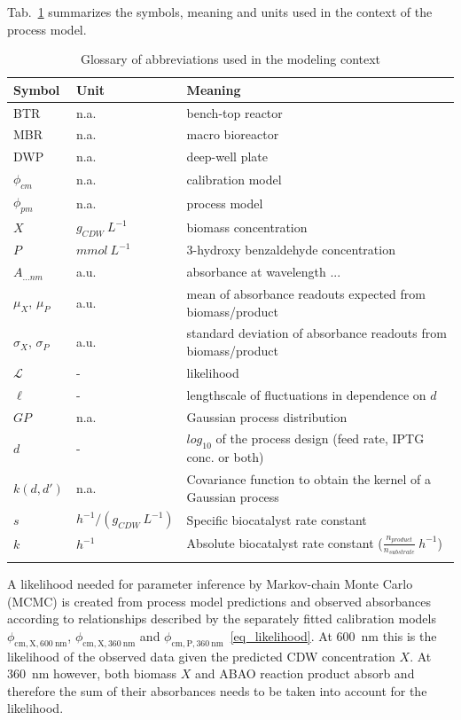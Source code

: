 \documentclass[sn-standardnature]{sn-jnl}%
\theoremstyle{thmstyleone}%
\theoremstyle{thmstyletwo}%
\theoremstyle{thmstylethree}%
\begin{document}
Tab.~\ref{tab_abbreviations} summarizes the symbols, meaning and units used in the context of the process model.


\begin{table}[h]
    \begin{center}
    \begin{minipage}{\textwidth}
    \caption{Glossary of abbreviations used in the modeling context}
    \label{tab_abbreviations}
    \begin{tabular}{@{}lll@{}}
\toprule
Symbol & Unit  & Meaning\\
\midrule
BTR & n.a. & bench-top reactor\\
MBR & n.a. & macro bioreactor\\
DWP & n.a. & deep-well plate\\
$\phi_{cm}$ & n.a. & calibration model\\
$\phi_{pm}$ & n.a. & process model\\
$X$ & $g_{CDW}\ L^{-1}$ & biomass concentration\\
$P$ & $mmol\ L^{-1}$ & 3-hydroxy benzaldehyde concentration\\
$A_{... nm}$ & a.u. & absorbance at wavelength ...\\
$\mu_X$, $\mu_P$ & a.u. & mean of absorbance readouts expected from biomass/product\\
$\sigma_X$, $\sigma_P$ & a.u. & standard deviation of absorbance readouts from biomass/product\\
$\mathcal{L}$ & - & likelihood\\
$\ell$ & - & lengthscale of fluctuations in dependence on $d$\\
$GP$ & n.a. & Gaussian process distribution\\
$d$ & - & $log_{10}$ of the process design (feed rate, IPTG conc. or both)\\
$k(d, d')$ & n.a. & Covariance function to obtain the kernel of a Gaussian process\\
$s$ & $h^{-1}/(g_{CDW}\ L^{-1})$ & Specific biocatalyst rate constant\\
$k$ & $h^{-1}$ & Absolute biocatalyst rate constant ($\frac{n_{product}}{n_{substrate}}\ h^{-1}$)\\
\botrule
    \end{tabular}
    \end{minipage}
    \end{center}
\end{table}

A likelihood needed for parameter inference by Markov-chain Monte Carlo (MCMC) is created from process model predictions and observed absorbances according to relationships described by the separately fitted calibration models $\phi_\mathrm{cm,X,600\ nm}$, $\phi_\mathrm{cm,X,360\ nm}$ and $\phi_\mathrm{cm,P,360\ nm}$~\eqref{eq_likelihood}.
At 600~nm this is the likelihood of the observed data given the predicted CDW concentration $X$.
At 360~nm however, both biomass $X$ and ABAO reaction product absorb and therefore the sum of their absorbances needs to be taken into account for the likelihood.
\end{document}
